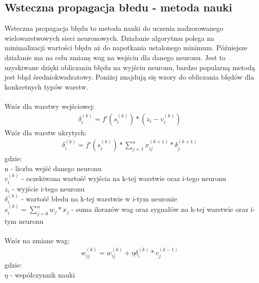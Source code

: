 \documentclass{classrep}
\begin{document}
{        \subsection{Wsteczna propagacja błedu - metoda nauki}
        {
            Wsteczna propagacja błędu to metoda nauki do uczenia nadzorowanego wielowarstwowych
            sieci neuronowych. Działanie algorytmu polega na minimalizacji wartości błędu aż
            do napotkania ustalonego minimum. Późniejsze działanie ma na celu zmianę wag na
            wejściu dla danego neuronu. Jest to uzyskiwane dzięki obliczaniu błędu na wyjściu
            neuronu, bardzo popularną metodą jest błąd średniokwadratowy. Poniżej znajdują się
            wzory do obliczania błędów dla konkretnych typów warstw.\\\\
            Wzór dla warstwy wejściowej:
            \begin{align*}
                \delta_i^{(k)}=f'(s_i^{(k)})*(z_i-v_i^{(k)})
            \end{align*}
            Wzór dla warstw ukrytych:
            \begin{align*}
                \delta_i^{(k)}=f'(s_i^{(k)})*\sum_{j=1}^{n} {x_{ij}^{(k+1)}*\delta_j^{(k+1)}}
            \end{align*}
            gdzie:\\
            n - liczba wejść danego neuronu\\
            $v_i^{(k)}$ - oczekiwana wartość wyjścia na k-tej warstwie oraz i-tego neuronu\\
            $z_i$ - wyjście i-tego neuronu\\
            $\delta_i^{(k)}$ - wartość błedu na k-tej warstwie w i-tym neuronie\\
            $s_i^{(k)}=\sum_{j=0}^{n} {w_j * x_j}$ - suma ilorazów wag oraz sygnałów
        na k-tej warstwie oraz i-tym neuronu\\\\
            Wzór na zmiane wag:
            \begin{align*}
                w_{ij}^{(k)}= w_{ij}^{(k)}+\eta\delta_i^{(k)}*v_j^{(k-1)}
            \end{align*}
            gdzie:\\
            $\eta$ - współczynnik nauki
        }
    }
\end{document}
